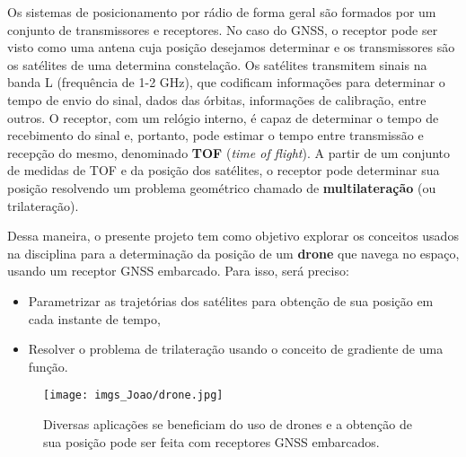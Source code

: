 \documentclass[9pt]{article}
\begin{document}
Os sistemas de posicionamento por rádio de forma geral são formados por um conjunto de transmissores e receptores. No caso do GNSS, o receptor pode ser visto como uma antena cuja posição desejamos determinar e os transmissores são os satélites de uma determina constelação. Os satélites transmitem sinais na banda L (frequência de 1-2 GHz), que codificam informações para determinar o tempo de envio do sinal, dados das órbitas, informações de calibração, entre outros. O receptor, com um relógio interno, é capaz de determinar o tempo de recebimento do sinal e, portanto, pode estimar o tempo entre transmissão e recepção do mesmo, denominado \textbf{TOF} (\textit{time of flight}). A partir de um conjunto de medidas de TOF e da posição dos satélites, o receptor pode determinar sua posição resolvendo um problema geométrico chamado de \textbf{multilateração} (ou trilateração).

Dessa maneira, o presente projeto tem como objetivo explorar os conceitos usados na disciplina para a determinação da posição de um \textbf{drone} que navega no espaço, usando um receptor GNSS embarcado. Para isso, será preciso:
\begin{itemize}
    \item Parametrizar as trajetórias dos satélites para obtenção de sua posição em cada instante de tempo,
    \item Resolver o problema de trilateração usando o conceito de gradiente de uma função.
\end{itemize}

\begin{figure}[H]
    \centering
    \texttt{[image: imgs\_Joao/drone.jpg]}
    \caption{Diversas aplicações se beneficiam do uso de drones e a obtenção de sua posição pode ser feita com receptores GNSS embarcados.}
    \label{fig:drone}
\end{figure}

\newpage

\noindent
\begin{tcolorbox}[colframe=black,width =7cm,colback=gray!20,arc=0pt]
\end{tcolorbox}

\vspace{0.3cm}
\end{document}
